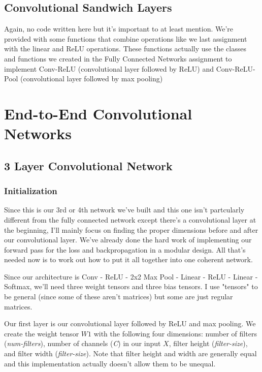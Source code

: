 \documentclass[12pt]{article}
\begin{document}
\subsection{Convolutional Sandwich Layers}
Again, no code written here but it's important to at least mention. We're provided with some functions 
that combine operations like we last assignment with the linear and ReLU operations. These functions 
actually use the classes and functions we created in the Fully Connected Networks assignment to 
implement Conv-ReLU (convolutional  layer followed by ReLU) and Conv-ReLU-Pool (convolutional 
layer followed by max pooling)


\section{End-to-End Convolutional Networks}

\subsection{3 Layer Convolutional Network}

\subsubsection{Initialization}

Since this is our 3rd or 4th network we've built and this one isn't partcularly different from the fully 
connected network except there's a convolutional layer at the beginning, I'll mainly focus on finding the 
proper dimensions before and after our convolutional layer. We've already done the hard work of implementing our 
forward pass for the loss and backpropagation in a modular design. 
All that's needed now is to work out how to put it all together into one coherent network. 

Since our architecture is Conv - ReLU - 2x2 Max Pool - Linear - ReLU - Linear - Softmax, we'll need three weight tensors
and three bias tensors. I use "tensors" to be general (since some of these aren't matrices) but some are just regular 
matrices. 

Our first layer is our convolutional layer followed by ReLU and max pooling. We create the weight tensor $W1$ with 
the following four dimensions: number of filters (\emph{num-filters}), number of channels (\emph{C}) in our input $X$, 
filter height (\emph{filter-size}), and filter width (\emph{filter-size}). Note that filter height and width are generally 
equal and this implementation actually doesn't allow them to be unequal.
\end{document}
